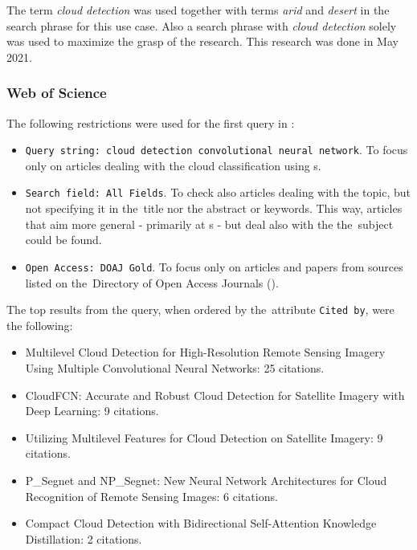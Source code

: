 The term \textit{cloud detection} was used together with terms \textit{arid} and \textit{desert} in the search phrase for this use case. Also a search phrase with \textit{cloud detection} solely was used to maximize the grasp of the research. This research was done in May 2021.

\subsubsection{Web of Science}
\label{cloud-detection-wos}

The following restrictions were used for the first query in :

\begin{itemize}
	\item \verb|Query string: cloud detection convolutional neural network|. To focus on\-ly on articles dealing with the cloud classification using s.
	\item \verb|Search field: All Fields|. To check also articles dealing with the topic, but not specifying it in the~title nor the abstract or keywords. This way, articles that aim more general - primarily at s - but deal also with the the~subject could be found.
	\item \verb|Open Access: DOAJ Gold|. To focus only on articles and papers from sources listed on the~Di\-rectory of Open Access Journals ().
\end{itemize}

\noindent The top results from the query, when ordered by the~attribute \verb|Cited by|, were the following:

\begin{itemize}
	\item Multilevel Cloud Detection for High-Resolution Remote Sensing Imagery Using Multiple Convolutional Neural Networks: 25 citations. \cite{multilevel-cloud-cnn}
	\item CloudFCN: Accurate and Robust Cloud Detection for Satellite Imagery with Deep Learning: 9 citations. \cite{cloudfcn}
	\item Utilizing Multilevel Features for Cloud Detection on Satellite Imagery: 9 citations. \cite{multilevel-features-cloud-cnn}
	\item P\_Segnet and NP\_Segnet: New Neural Network Architectures for Cloud Recognition of Remote Sensing Images: 6 citations. \cite{p-segnet-cloud}
	\item Compact Cloud Detection with Bidirectional Self-Attention Knowledge Distillation: 2 citations. \cite{bi-sad-cloud}
\end{itemize}

